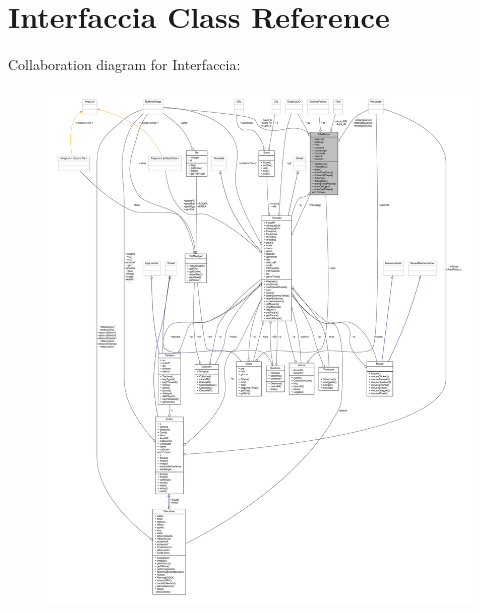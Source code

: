 \hypertarget{classa_1_1survival_1_1game_1_1_interfaccia}{}\section{Interfaccia Class Reference}
\label{classa_1_1survival_1_1game_1_1_interfaccia}


Collaboration diagram for Interfaccia\+:
\nopagebreak
\begin{figure}[H]
\begin{center}
\leavevmode
\includegraphics[width=350pt]{classa_1_1survival_1_1game_1_1_interfaccia__coll__graph}
\end{center}
\end{figure}
